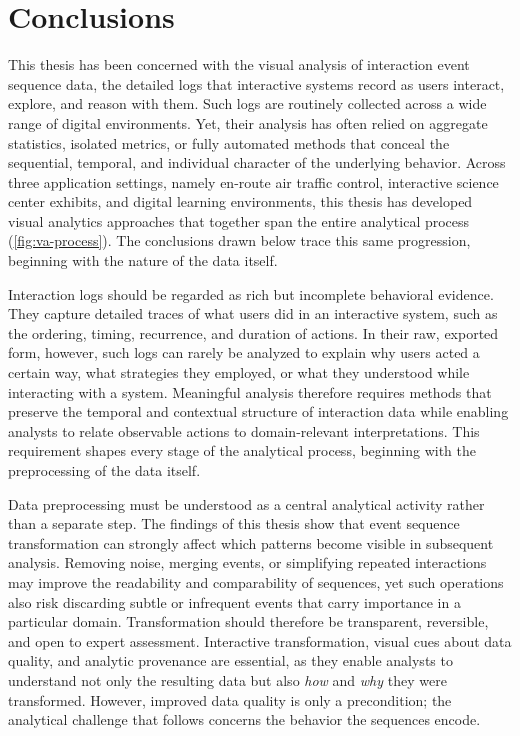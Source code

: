 \section{Conclusions}

This thesis has been concerned with the visual analysis of interaction event sequence data, the detailed logs that interactive systems record as users interact, explore, and reason with them.
Such logs are routinely collected across a wide range of digital environments.
Yet, their analysis has often relied on aggregate statistics, isolated metrics, or fully automated methods that conceal the sequential, temporal, and individual character of the underlying behavior.
Across three application settings, namely en-route air traffic control, interactive science center exhibits, and digital learning environments, this thesis has developed visual analytics approaches that together span the entire analytical process (\cref{fig:va-process}).
The conclusions drawn below trace this same progression, beginning with the nature of the data itself.

Interaction logs should be regarded as rich but incomplete behavioral evidence.
They capture detailed traces of what users did in an interactive system, such as the ordering, timing, recurrence, and duration of actions.
In their raw, exported form, however, such logs can rarely be analyzed to explain why users acted a certain way, what strategies they employed, or what they understood while interacting with a system.
Meaningful analysis therefore requires methods that preserve the temporal and contextual structure of interaction data while enabling analysts to relate observable actions to domain-relevant interpretations.
This requirement shapes every stage of the analytical process, beginning with the preprocessing of the data itself.

Data preprocessing must be understood as a central analytical activity rather than a separate step.
The findings of this thesis show that event sequence transformation can strongly affect which patterns become visible in subsequent analysis.
Removing noise, merging events, or simplifying repeated interactions may improve the readability and comparability of sequences, yet such operations also risk discarding subtle or infrequent events that carry importance in a particular domain.
Transformation should therefore be transparent, reversible, and open to expert assessment.
Interactive transformation, visual cues about data quality, and analytic provenance are essential, as they enable analysts to understand not only the resulting data but also \textit{how} and \textit{why} they were transformed.
However, improved data quality is only a precondition; the analytical challenge that follows concerns the behavior the sequences encode.

